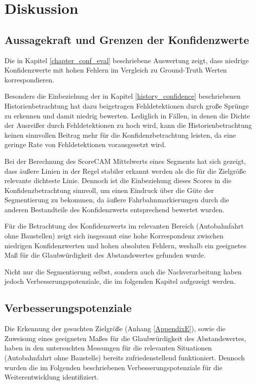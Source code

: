 \chapter{Diskussion} 

\label{Diskussion}

\section{Aussagekraft und Grenzen der Konfidenzwerte}
Die in Kapitel \ref{chapter_conf_eval} beschriebene Auswertung zeigt, dass niedrige Konfidenzwerte mit hohen Fehlern im Vergleich zu Ground-Truth Werten korrespondieren.
 
Besonders die Einbeziehung der in Kapitel \ref{history_confidence} beschriebenen Historienbetrachtung hat dazu beigetragen Fehldetektionen durch gro{\ss}e Sprünge zu erkennen und damit niedrig bewerten. Lediglich in Fällen, in denen die Dichte der Ausrei{\ss}er durch Fehldetektionen zu hoch wird, kann die Historienbetrachtung keinen sinnvollen Beitrag mehr für die Konfidenzbetrachtung leisten, da eine geringe Rate von Fehldetektionen vorausgesetzt wird.

Bei der Berechnung des ScoreCAM Mittelwerts eines Segments hat sich gezeigt, dass äu{\ss}ere Linien in der Regel stabiler erkannt werden als die für die Zielgrö{\ss}e relevante dichteste Linie. Dennoch ist die Einbeziehung dieses Scores in die Konfidenzbetrachtung sinnvoll, um einen Eindruck über die Güte der Segmentierung zu bekommen, da äu{\ss}ere Fahrbahnmarkierungen durch die anderen Bestandteile des Konfidenzwerts entsprechend bewertet wurden.

Für die Betrachtung des Konfidenzwerts im relevanten Bereich (Autobahnfahrt ohne Baustellen) zeigt sich insgesamt eine hohe Korrespondenz zwischen niedrigen Konfidenzwerten und hohen absoluten Fehlern, weshalb ein geeignetes Ma{\ss} für die Glaubwürdigkeit des Abstandswertes gefunden wurde.

Nicht nur die Segmentierung selbst, sondern auch die Nachverarbeitung haben jedoch Verbesserungspotenziale, die im folgenden Kapitel aufgezeigt werden.

\section{Verbesserungspotenziale}
\label{chapter_verbesserungen}
    Die Erkennung der gesuchten Zielgrö{\ss}e (Anhang \ref{AppendixE}), sowie die Zuweisung eines geeigneten Ma{\ss}es für die Glaubwürdigkeit des Abstandswertes, haben in den untersuchten Messungen für die relevanten Situationen (Autobahnfahrt ohne Baustelle) bereits zufriedenstellend funktioniert.
    Dennoch wurden die im Folgenden beschriebenen Verbesserungspotenziale für die Weiterentwicklung identifiziert.

